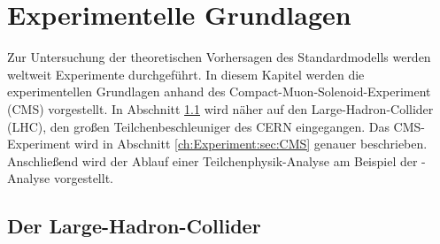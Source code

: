 \chapter{Experimentelle Grundlagen}
\label{ch:experiment}

{}

Zur Untersuchung der theoretischen Vorhersagen des Standardmodells werden weltweit Experimente durchgef\"uhrt. In diesem Kapitel werden die experimentellen Grundlagen anhand des Compact-Muon-Solenoid-Experiment (CMS) vorgestellt. In Abschnitt \ref{ch:Experiment:sec:LHC} wird n\"aher auf den Large-Hadron-Collider (LHC), den gro\ss en Teilchenbeschleuniger des CERN eingegangen. Das CMS-Experiment wird in Abschnitt \ref{ch:Experiment:sec:CMS} genauer beschrieben.\\%
Anschlie\ss end wird der Ablauf einer Teilchenphysik-Analyse am Beispiel der \ttH-Analyse vorgestellt.

\section{Der Large-Hadron-Collider}
\label{ch:Experiment:sec:LHC}

